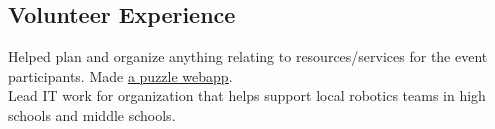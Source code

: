 \documentclass[11pt,letter,sans]{moderncv}
\begin{document}
\subsection{\textbf{Volunteer Experience}}
Helped plan and organize anything relating to resources/services for the event participants.
Made \href{https://github.com/BoilerMake/puzzles-BM4}{\underline{a puzzle webapp}}.
\\
Lead IT work for organization that helps support local robotics teams in high schools and middle schools.
\end{document}
